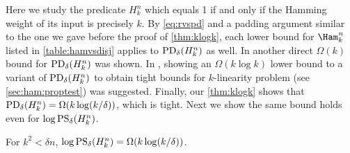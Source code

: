 Here we study the predicate $H^n_k$ which equals 1 if 
and only if the Hamming weight of its input is precisely $k$. 
By \autoref{eq:rvspd} and a padding argument similar to the 
one we gave before the proof of \autoref{thm:klogk}, each lower 
bound for $\Ham^n_k$ listed in \autoref{table:hamvsdisj} applies 
to $\mathrm{PD}_\delta(H^n_k)$ as well. In \cite{BlaisK2012} another 
direct $\Omega(k)$ bound for $\mathrm{PD}_\delta(H^n_k)$ was shown. In 
\cite{BhrushundiCK2014}, showing an $\Omega(k\log k)$ lower bound 
to a variant of $\mathrm{PD}_\delta(H^n_k)$ to obtain tight bounds for 
$k$-linearity problem (see \autoref{sec:ham:proptest}) was suggested. 
Finally, our \autoref{thm:klogk} shows that 
$\mathrm{PD}_\delta(H^n_k)=\Omega(k\log(k/\delta))$, which is tight. 
Next we show the same bound holds even for $\log \mathrm{PS}_\delta(H^n_k)$.

\begingroup
\def\thetheorem{\ref{thm:paritysize}}
\begin{theorem}[restated]
For $k^2<\delta n$, 
$\log \mathrm{PS}_\delta(H^n_k)=\Omega(k\log(k/\delta))$.
\end{theorem}
\addtocounter{theorem}{-1}
\endgroup
